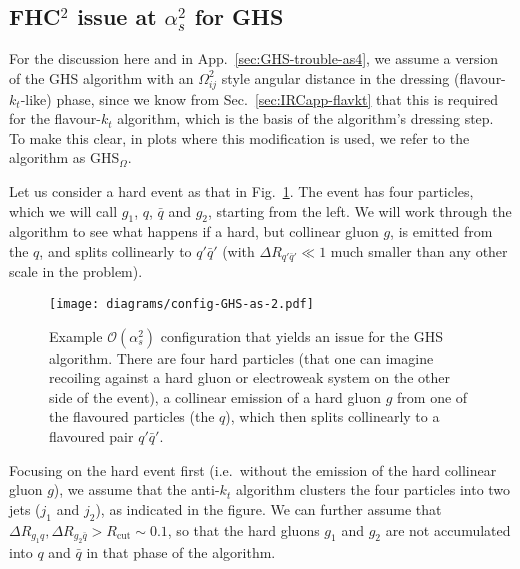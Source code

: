 \documentclass[nofootinbib,twocolumn,preprintnumbers,superscriptaddress,aps]{revtex4-2}
\newcommand{\as}{\alpha_s}
\begin{document}
\subsection{FHC$^2$ issue at $\as^2$ for GHS}
\label{sec:GHS-trouble-as2}

For the discussion here and in App.~\ref{sec:GHS-trouble-as4}, we assume a version of the GHS algorithm
with an $\Omega_{ij}^2$ style angular distance in the dressing
(flavour-$k_t$-like) phase, since we know from
Sec.~\ref{sec:IRCapp-flavkt} that this is required for the
flavour-$k_t$ algorithm, which is the basis of the algorithm's
dressing step.
%
To make this clear, in plots where this modification is used, we
refer to the algorithm as GHS$_\Omega$.


Let us consider a hard event as that in Fig.~\ref{fig:config-GHS-as2}.
The event has four particles, which we will call $g_1$, $q$,
$\bar{q}$ and $g_2$, starting from the left.
%
We will work through the algorithm
to see what happens if a hard, but collinear gluon $g$, is emitted from the $q$,
and splits collinearly to $q' \bar q'$ (with $\Delta R_{q' \bar q'} \ll 1$
much smaller than any other scale in the problem).

%
\begin{figure}
  \centering
  \texttt{[image: diagrams/config-GHS-as-2.pdf]}
  \caption{
    Example $\mathcal{O}(\as^2)$ configuration that yields an issue for the GHS algorithm.
    There are four
    hard particles (that one can imagine recoiling against a hard
    gluon or electroweak system on the other side of the event), a
    collinear emission of a hard gluon $g$ from one of the flavoured
    particles (the $q$), which then splits collinearly to a flavoured
    pair $q'\bar q'$.}
  \label{fig:config-GHS-as2}
\end{figure}


Focusing on the hard event first (i.e.\ without the emission of the
hard collinear gluon $g$), we assume that the anti-$k_t$ algorithm clusters the four particles
into two jets ($j_1$ and $j_2$), as indicated in the figure.
%
We can further assume that $\Delta R_{g_1 q}, \Delta R_{g_2 \bar{q}} > 
R_{\text{cut}} \sim 0.1$, so that the hard gluons $g_1$ and $g_2$
are not accumulated into $q$ and $\bar q$ in that phase of the algorithm.
%
\end{document}
